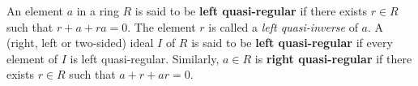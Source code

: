 An element $a$ in a ring $R$ is said to be \textbf{left quasi-regular} if there exists $r \in R$ such that $r + a + ra = 0$. The element $r$ is called a \textit{left quasi-inverse} of $a$. A (right, left or two-sided) ideal $I$ of $R$ is said to be \textbf{left quasi-regular} if every element of $I$ is left quasi-regular. Similarly, $a \in R$ is \textbf{right quasi-regular} if there exists $r \in R$ such that $a + r + ar = 0$.
